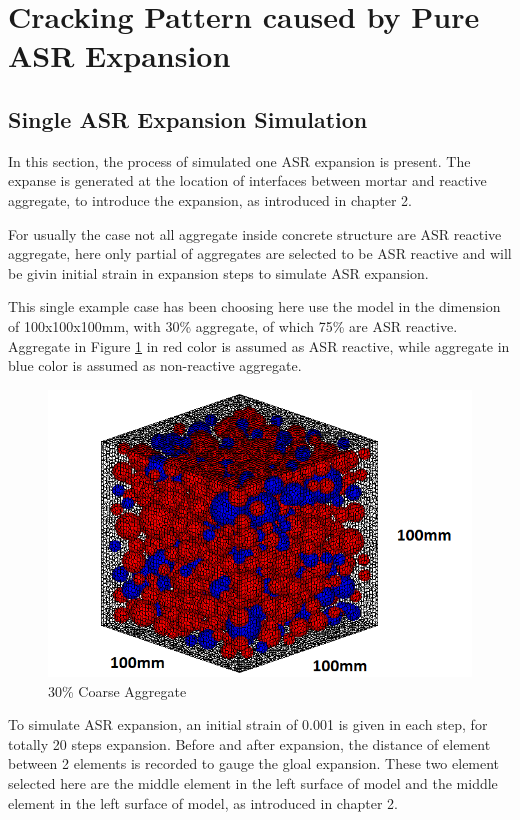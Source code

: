 \clearpage
\section{Cracking Pattern caused by Pure ASR Expansion}


\subsection{Single ASR Expansion Simulation}


In this section, the process of simulated one ASR expansion is present. The expanse is generated at the location of interfaces between mortar and reactive aggregate, to introduce the expansion, as introduced in chapter 2.

For usually the case not all aggregate inside concrete structure are ASR reactive aggregate, here only partial of aggregates are selected to be ASR reactive and will be givin initial strain in expansion steps to simulate ASR expansion.

This single example case has been choosing here use the model in the dimension of 100x100x100mm, with 30\% aggregate, of which 75\% are ASR reactive. Aggregate in Figure \ref{fig:A30_modelll} in red color is assumed as ASR reactive, while aggregate in blue color is assumed as non-reactive aggregate.

  \begin{figure}[ht!]
  \centering
  \includegraphics[width=.3\linewidth]{Files/Aggregate/A30P75.png}
    \caption{30\% Coarse Aggregate}
    \label{fig:A30_modelll}
  \end{figure}

To simulate ASR expansion, an initial strain of 0.001 is given in each step, for totally 20 steps expansion. Before and after expansion, the distance of element between 2 elements is recorded to gauge the gloal expansion. These two element selected here are the middle element in the left surface of model and the middle element in the left surface of model, as introduced in chapter 2.

